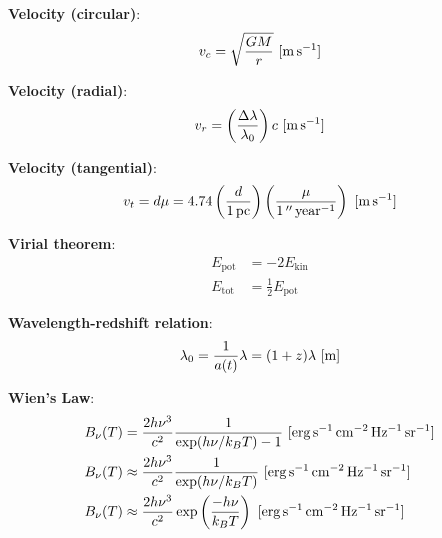 \documentclass[a4paper,11pt]{article}
\begin{document}
{\noindent}\textbf{Velocity (circular)}:
\begin{align*}
    v_c = \sqrt{\frac{GM}{r}} ~ [{\rm m\,s^{-1}}]
\end{align*}

{\noindent}\textbf{Velocity (radial)}:
\begin{align*}
    v_r = \left(\frac{\Delta\lambda}{\lambda_0}\right)c ~ [{\rm m\,s^{-1}}]
\end{align*}

{\noindent}\textbf{Velocity (tangential)}:
\begin{align*}
    v_t = d\mu = 4.74\left(\frac{d}{1\,{\rm pc}}\right) \left(\frac{\mu}{1\,''\,{\rm year^{-1}}}\right) ~ [{\rm m\,s^{-1}}]
\end{align*}

{\noindent}\textbf{Virial theorem}:
\begin{align*}
    E_\mathrm{pot} &= -2E_\mathrm{kin} \\
    E_\mathrm{tot} &= \frac{1}{2}E_\mathrm{pot}
\end{align*}

{\noindent}\textbf{Wavelength-redshift relation}:
\begin{align*}
    \lambda_0 = \frac{1}{a(t)}\lambda = (1+z)\lambda ~ [{\rm m}]
\end{align*}

{\noindent}\textbf{Wien's Law}:
\begin{align*}
    B_\nu(T) &= \frac{2h\nu^3}{c^2} \frac{1}{\exp(h\nu/k_BT) - 1} ~ [{\rm erg\,s^{-1}\,cm^{-2}\,Hz^{-1}\,sr^{-1}}] \\
    B_\nu(T) &\approx \frac{2h\nu^3}{c^2} \frac{1}{\exp(h\nu/k_BT)} ~ [{\rm erg\,s^{-1}\,cm^{-2}\,Hz^{-1}\,sr^{-1}}] \\
    B_\nu(T) &\approx \frac{2h\nu^3}{c^2} \exp\left(\frac{-h\nu}{k_BT}\right) ~ [{\rm erg\,s^{-1}\,cm^{-2}\,Hz^{-1}\,sr^{-1}}]
\end{align*}
\end{document}
